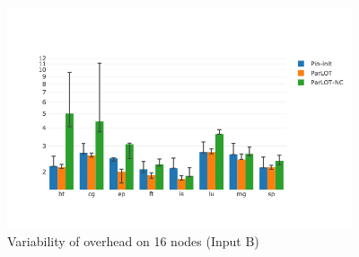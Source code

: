 \begin{figure}[!t]
\centering
\includegraphics[width=4in]{figs.comet.newMed/comet_BX2_Main_16_B_p3_5.png}
\caption{ Variability of \parlotm overhead on 16 nodes (Input B)
}
\label{comet_BX2_Main_16_B_p3_5}
\end{figure}


